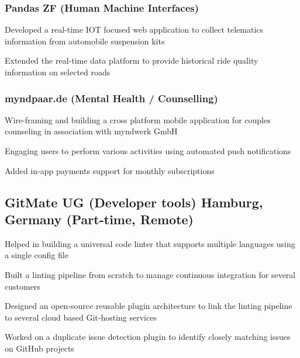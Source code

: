 \documentclass[letter,10pt]{article}
\begin{document}
\subsubsection*{Pandas ZF (Human Machine Interfaces)}
\begin{zitemize}
\item Developed a real-time IOT focused web application to collect telematics information from automobile suspension kits
\item Extended the real-time data platform to provide historical ride quality information on selected roads
\end{zitemize}

\subsubsection*{myndpaar.de (Mental Health / Counselling)}
\begin{zitemize}
\item Wire-framing and building a cross platform mobile application for couples counseling in association with myndwerk GmbH
\item Engaging users to perform various activities using automated push notifications
\item Added in-app payments support for monthly subscriptions
\end{zitemize}

\newpage


\subsection{GitMate UG (Developer tools) \hfill Hamburg, Germany (Part-time, Remote)}
\begin{zitemize}
\item Helped in building a universal code linter that supports multiple languages using a single config file
\item Built a linting pipeline from scratch to manage continuous integration for several customers
\item Designed an open-source reusable plugin architecture to link the linting pipeline to several cloud based Git-hosting services
\item Worked on a duplicate issue detection plugin to identify closely matching issues on GitHub projects
\end{zitemize}
\end{document}
